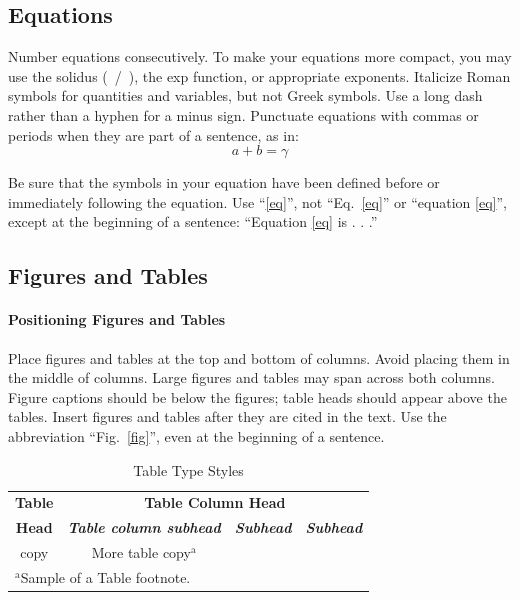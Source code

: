 \documentclass[conference]{IEEEtran}
\begin{document}
\subsection{Equations}
Number equations consecutively. To make your 
equations more compact, you may use the solidus (~/~), the exp function, or 
appropriate exponents. Italicize Roman symbols for quantities and variables, 
but not Greek symbols. Use a long dash rather than a hyphen for a minus 
sign. Punctuate equations with commas or periods when they are part of a 
sentence, as in:
\begin{equation}
a+b=\gamma\label{eq}
\end{equation}

Be sure that the 
symbols in your equation have been defined before or immediately following 
the equation. Use ``\eqref{eq}'', not ``Eq.~\eqref{eq}'' or ``equation \eqref{eq}'', except at 
the beginning of a sentence: ``Equation \eqref{eq} is . . .''

\subsection{Figures and Tables}
\paragraph{Positioning Figures and Tables} Place figures and tables at the top and 
bottom of columns. Avoid placing them in the middle of columns. Large 
figures and tables may span across both columns. Figure captions should be 
below the figures; table heads should appear above the tables. Insert 
figures and tables after they are cited in the text. Use the abbreviation 
``Fig.~\ref{fig}'', even at the beginning of a sentence.

\begin{table}[htbp]
\caption{Table Type Styles}
\begin{center}
\begin{tabular}{|c|c|c|c|}
\hline
\textbf{Table}&\multicolumn{3}{|c|}{\textbf{Table Column Head}} \\
\cline{2-4} 
\textbf{Head} & \textbf{\textit{Table column subhead}}& \textbf{\textit{Subhead}}& \textbf{\textit{Subhead}} \\
\hline
copy& More table copy$^{\mathrm{a}}$& &  \\
\hline
\multicolumn{4}{l}{$^{\mathrm{a}}$Sample of a Table footnote.}
\end{tabular}
\label{tab1}
\end{center}
\end{table}
\end{document}
